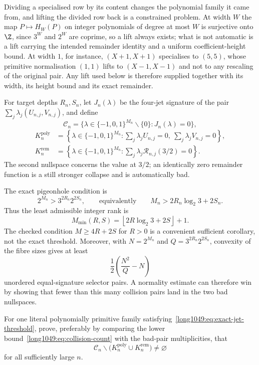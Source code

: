 \documentclass[11pt]{article}
\begin{document}
Dividing a specialised row by its content changes the polynomial family it came
from, and lifting the divided row back is a constrained problem.  At width $W$ the map $P\mapsto H_W(P)$ on integer polynomials of
degree at most $W$ is surjective onto $\Z$, since $3^{W}$ and $2^{W}$ are
coprime, so a lift always exists; what is not automatic is a lift carrying the
intended remainder identity and a uniform coefficient-height bound.  At width
$1$, for instance, $(X+1,X+1)$ specialises to $(5,5)$, whose primitive
normalisation $(1,1)$ lifts to $(X-1,X-1)$ and not to any rescaling of the
original pair.  Any lift used below is therefore supplied together with its
width, its height bound and its exact remainder.

For target depths $R_n,S_n$, let $J_n(\lambda)$ be the four-jet signature of
the pair $\sum_j\lambda_j(U_{n,j},V_{n,j})$, and define
\[
 \mathcal C_n=
 \{\lambda\in\{-1,0,1\}^{M_n}\mathbin{\backslash}\{0\}:J_n(\lambda)=0\},
\]
\[
\begin{aligned}
 K_n^{\mathrm{poly}}
   &=\left\{\lambda\in\{-1,0,1\}^{M_n}:
       \sum_j\lambda_jU_{n,j}=0,\ \sum_j\lambda_jV_{n,j}=0\right\},\\
 K_n^{\mathrm{rem}}
   &=\left\{\lambda\in\{-1,0,1\}^{M_n}:
       \sum_j\lambda_j\mathcal R_{n,j}(3/2)=0\right\}.
\end{aligned}
\]
The second nullspace concerns the value at $3/2$; an identically zero
remainder function is a still stronger collapse and is automatically bad.

The exact pigeonhole condition is
\[
 2^{M_n}>3^{2R_n}2^{2S_n},
 \qquad\text{equivalently}\qquad
 M_n>2R_n\log_2 3+2S_n.
\tag{8.1}\label{long1049:eq:exact-jet-threshold}
\]
Thus the least admissible integer rank is
\[
 M_{\min}(R,S)=
 \left\lfloor2R\log_2 3+2S\right\rfloor+1.
\]
The checked condition $M\ge4R+2S$ for $R>0$ is a convenient sufficient
corollary, not the exact threshold.  Moreover, with
$N=2^{M_n}$ and $Q=3^{2R_n}2^{2S_n}$, convexity of the fibre sizes gives at
least
\[
 \frac12\left(\frac{N^2}{Q}-N\right)
\tag{8.2}\label{long1049:eq:collision-count}
\]
unordered equal-signature selector pairs.  A normality estimate can therefore
win by showing that fewer than this many collision pairs land in the two bad
nullspaces.

\begin{problem}\label{long1049:prob:escape}
For one literal polynomially primitive family
satisfying~\eqref{long1049:eq:exact-jet-threshold},
prove, preferably by comparing the lower bound~\eqref{long1049:eq:collision-count} with
the bad-pair multiplicities, that
\[
 \mathcal C_n\mathbin{\backslash}
 \bigl(K_n^{\mathrm{poly}}\cup K_n^{\mathrm{rem}}\bigr)
 \ne\varnothing
\]
for all sufficiently large $n$.
\end{problem}
\end{document}
